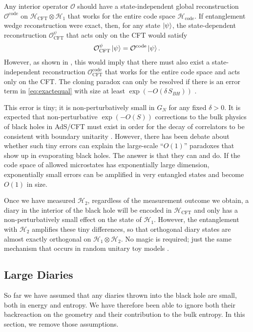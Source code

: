 \documentclass[12pt]{article}
\begin{document}
Any interior operator $\mathcal{O}$ should have a state-independent global reconstruction $\mathcal{O}^\text{code}$ on $\mathcal{H}_\text{CFT} \otimes \mathcal{H}_{1}$ that works for the entire code space $\mathcal{H}_\text{code}$. If entanglement wedge reconstruction were exact, then, for any state $\ket{\psi}$, the state-dependent reconstruction $\mathcal{O}_\text{CFT}^{\psi}$ that acts only on the CFT would satisfy
\begin{align} \label{eq:exactequal}
\mathcal{O}_\text{CFT}^{\psi} \ket{\psi} = \mathcal{O}^\text{code} \ket{\psi}.
\end{align}
However, as shown in \cite{hayden2012weak, alphabits}, this would imply that there must also exist a state-independent reconstruction $\mathcal{O}_\text{CFT}^\text{code}$ that works for the entire code space and acts only on the CFT. The cloning paradox can only be resolved if there is an error term in \eqref{eq:exactequal} with size at least $\exp(-O(\delta \,S_{BH}))$ \cite{alphabits}.

This error is tiny; it is non-perturbatively small in $G_N$ for any fixed $\delta > 0$. It is expected that non-perturbative $\exp(-O(S))$ corrections to the bulk physics of black holes in AdS/CFT must exist in order for the decay of correlators to be consistent with boundary unitarity \cite{maldacena2003eternal}. However, there has been debate about whether such tiny errors can explain the large-scale ``$O(1)$'' paradoxes that show up in evaporating black holes. The answer is that they can and do. If the code space of allowed microstates has exponentially large dimension, exponentially small errors can be amplified in very entangled states and become $O(1)$ in size. 

Once we have measured $\mathcal{H}_2$, regardless of the measurement outcome we obtain, a diary in the interior of the black hole will be encoded in $\mathcal{H}_\text{CFT}$ and only has a non-perturbatively small effect on the state of $\mathcal{H}_1$. However, the entanglement with $\mathcal{H}_2$ amplifies these tiny differences, so that orthogonal diary states are almost exactly orthogonal on $\mathcal{H}_1 \otimes \mathcal{H}_2$. No magic is required; just the same mechanism that occurs in random unitary toy models \cite{alphabits}.

\subsection{Large Diaries} \label{sec:largediaries}
So far we have assumed that any diaries thrown into the black hole are small, both in energy and entropy. We have therefore been able to ignore both their backreaction on the geometry and their contribution to the bulk entropy. In this section, we remove those assumptions. 
\end{document}
